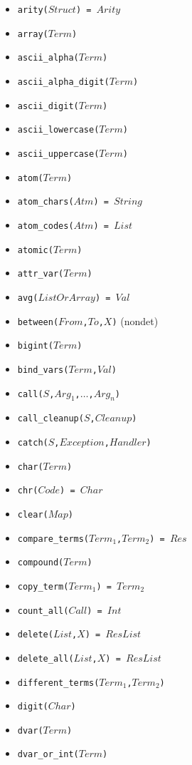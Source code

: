 \documentclass[10pt]{article}
\begin{document}
\begin{multicols}{2}
\begin{scriptsize}
\begin{itemize}
    \item \texttt{arity($Struct$) = $Arity$}
    \item \texttt{array($Term$)}
    \item \texttt{ascii\_alpha($Term$)}
    \item \texttt{ascii\_alpha\_digit($Term$)}
    \item \texttt{ascii\_digit($Term$)}
    \item \texttt{ascii\_lowercase($Term$)}
    \item \texttt{ascii\_uppercase($Term$)}
    \item \texttt{atom($Term$)}
    \item \texttt{atom\_chars($Atm$) = $String$}
    \item \texttt{atom\_codes($Atm$) = $List$}
    \item \texttt{atomic($Term$)}
    \item \texttt{attr\_var($Term$)}
    \item \texttt{avg($ListOrArray$) = $Val$}
    \item \texttt{between($From$,$To$,$X$)} (nondet)
    \item \texttt{bigint($Term$)}
    \item \texttt{bind\_vars($Term$,$Val$)}
    \item \texttt{call($S$,$Arg_1$,$\ldots$,$Arg_n$)}
    \item \texttt{call\_cleanup($S$,$Cleanup$)}
    \item \texttt{catch($S$,$Exception$,$Handler$)}
    \item \texttt{char($Term$)}
    \item \texttt{chr($Code$) = $Char$}
    \item \texttt{clear($Map$)}
    \item \texttt{compare\_terms($Term_1$,$Term_2$) = $Res$}
    \item \texttt{compound($Term$)}
    \item \texttt{copy\_term($Term_1$) = $Term_2$}
    \item \texttt{count\_all($Call$) = $Int$}
    \item \texttt{delete($List$,$X$) = $ResList$}
    \item \texttt{delete\_all($List$,$X$) = $ResList$}
    \item \texttt{different\_terms($Term_1$,$Term_2$)}
    \item \texttt{digit($Char$)}
    \item \texttt{dvar($Term$)}
    \item \texttt{dvar\_or\_int($Term$)}

\end{itemize}
\end{scriptsize}
\end{multicols}
\end{document}
